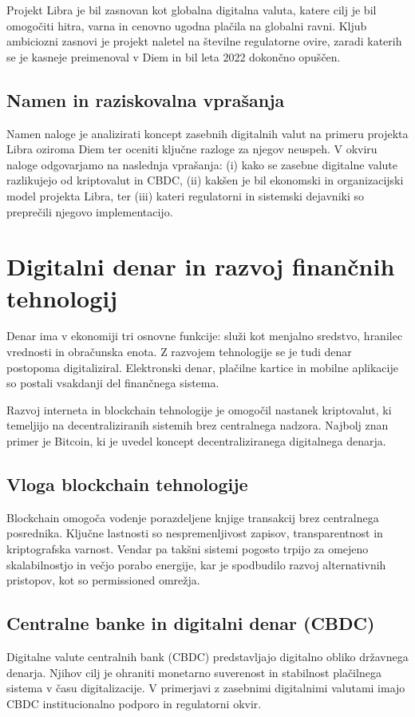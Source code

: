 \documentclass[12pt,a4paper]{article}
\begin{document}
Projekt Libra je bil zasnovan kot globalna digitalna valuta, katere cilj je bil omogočiti hitra, varna in cenovno ugodna plačila na globalni ravni. Kljub ambiciozni zasnovi je projekt naletel na številne regulatorne ovire, zaradi katerih se je kasneje preimenoval v Diem in bil leta 2022 dokončno opuščen.

\subsection{Namen in raziskovalna vprašanja}
Namen naloge je analizirati koncept zasebnih digitalnih valut na primeru projekta Libra oziroma Diem ter oceniti ključne razloge za njegov neuspeh. V okviru naloge odgovarjamo na naslednja vprašanja: (i) kako se zasebne digitalne valute razlikujejo od kriptovalut in CBDC, (ii) kakšen je bil ekonomski in organizacijski model projekta Libra, ter (iii) kateri regulatorni in sistemski dejavniki so preprečili njegovo implementacijo.

\section{Digitalni denar in razvoj finančnih tehnologij}

Denar ima v ekonomiji tri osnovne funkcije: služi kot menjalno sredstvo, hranilec vrednosti in obračunska enota. Z razvojem tehnologije se je tudi denar postopoma digitaliziral. Elektronski denar, plačilne kartice in mobilne aplikacije so postali vsakdanji del finančnega sistema.

Razvoj interneta in blockchain tehnologije je omogočil nastanek kriptovalut, ki temeljijo na decentraliziranih sistemih brez centralnega nadzora. Najbolj znan primer je Bitcoin, ki je uvedel koncept decentraliziranega digitalnega denarja.

\subsection{Vloga blockchain tehnologije}
Blockchain omogoča vodenje porazdeljene knjige transakcij brez centralnega posrednika. Ključne lastnosti so nespremenljivost zapisov, transparentnost in kriptografska varnost. Vendar pa takšni sistemi pogosto trpijo za omejeno skalabilnostjo in večjo porabo energije, kar je spodbudilo razvoj alternativnih pristopov, kot so permissioned omrežja.

\subsection{Centralne banke in digitalni denar (CBDC)}
Digitalne valute centralnih bank (CBDC) predstavljajo digitalno obliko državnega denarja. Njihov cilj je ohraniti monetarno suverenost in stabilnost plačilnega sistema v času digitalizacije. V primerjavi z zasebnimi digitalnimi valutami imajo CBDC institucionalno podporo in regulatorni okvir.
\end{document}
